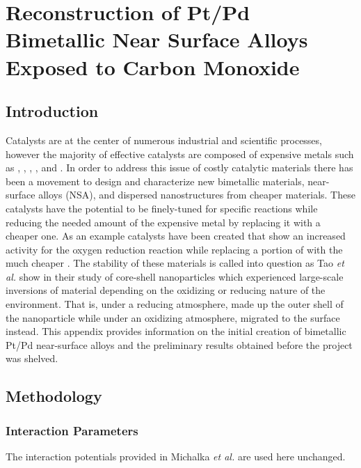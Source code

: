 
\chapter{Reconstruction of Pt/Pd Bimetallic Near Surface Alloys Exposed to Carbon Monoxide}


\section{Introduction}


Catalysts are at the center of numerous industrial and scientific processes,
however the majority of effective catalysts are composed of expensive metals
such as , , , , and .  In order to address
this issue of costly catalytic materials there has been a movement to design
and characterize new bimetallic materials,\citep{} near-surface alloys
(NSA),\citep{} and dispersed nanostructures\citep{} from cheaper materials.
These catalysts have the potential to be finely-tuned for specific reactions
while reducing the needed amount of the expensive metal by replacing it with a
cheaper one. As an example  catalysts have been created that show an
increased activity for the oxygen reduction reaction while replacing a portion
of  with the much cheaper . The stability of these materials is
called into question as Tao {\em et al.} show in their study of 
core-shell nanoparticles which experienced large-scale inversions of material
depending on the oxidizing or reducing nature of the
environment.\cite{Tao:2008aa} That is, under a reducing atmosphere, \ce{} made
up the outer shell of the nanoparticle while under an oxidizing atmosphere,
\ce{} migrated to the surface instead. This appendix provides information on
the initial creation of bimetallic Pt/Pd near-surface alloys and the
preliminary results obtained before the project was shelved.

\section{Methodology}

\subsection{Interaction Parameters}
The interaction potentials provided in Michalka {\em et
al.}\citep{Michalka:2015aa} are used here unchanged.




